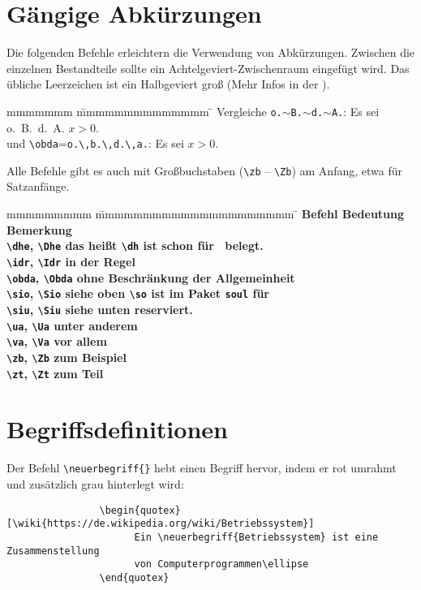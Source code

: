 		\newpage
		\section{Gängige Abkürzungen}
			Die folgenden Befehle erleichtern die Verwendung von Abkürzungen. Zwischen die einzelnen Bestandteile sollte ein Achtelgeviert-Zwischenraum eingefügt wird. Das übliche Leerzeichen ist \idr ein Halbgeviert groß (Mehr Infos in der ).
			\begin{tabbing}
				mmmmmmm			\= mmmmmmmmmmmmmm						\= \kill
				Vergleiche		\>\texttt{o.$\sim$B.$\sim$d.$\sim$A.}:	\> Es sei o.~B.~d.~A. $x>0$.\\
				und				\>\verb|\obda|=\verb|o.\,b.\,d.\,a.|:	\> Es sei \obda $x>0$.
			\end{tabbing}
			Alle Befehle gibt es auch mit Großbuchstaben (\verb|\zb| -- \verb|\Zb|) am Anfang, etwa für Satzanfänge.
			\begin{tabbing}
				mmmmmmmmm						\= mmmmmmmmmmmmmmmmmmmmm		\=\kill
				\bf Befehl						\> \bf Bedeutung 				\> \bf Bemerkung\\
				\verb|\dhe|, \verb|\Dhe|		\> das heißt 					\> \verb|\dh| ist schon für \dh\ belegt.	\\
				\verb|\idr|, \verb|\Idr|		\> in der Regel															\\
				\verb|\obda|, \verb|\Obda|		\> ohne Beschränkung der Allgemeinheit 									\\
				\verb|\sio|, \verb|\Sio|		\> siehe oben 					\> \verb|\so| ist im Paket \texttt{soul} für 			\\
				\verb|\siu|, \verb|\Siu|		\> siehe unten					\> \so{gesperrt} reserviert.				\\
				\verb|\ua|, \verb|\Ua|			\> unter anderem														\\
				\verb|\va|, \verb|\Va|			\> vor allem															\\
				\verb|\zb|, \verb|\Zb|			\> zum Beispiel															\\
				\verb|\zt|,	\verb|\Zt|			\> zum Teil				
			\end{tabbing}
		\section{Begriffsdefinitionen}
			\label{begriffsdefinitionen}
			Der Befehl \verb|\neuerbegriff{}| hebt einen Begriff hervor, indem er rot umrahmt und zusätzlich grau hinterlegt wird:
			\begin{verbatim}
				\begin{quotex}[\wiki{https://de.wikipedia.org/wiki/Betriebssystem}]
				      Ein \neuerbegriff{Betriebssystem} ist eine Zusammenstellung 
				      von Computerprogrammen\ellipse 
				\end{quotex}
			\end{verbatim}
			
